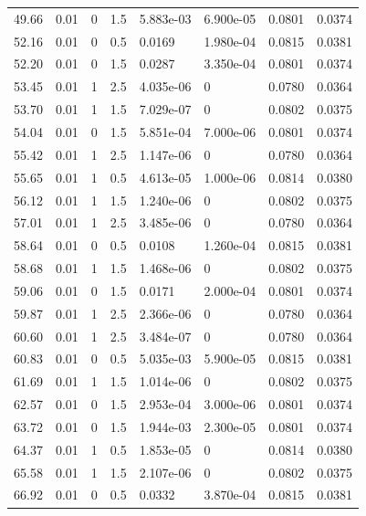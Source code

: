 \documentclass[preview]{standalone}
\begin{document}
{{{\begin{tabular}{L{1.2cm}C{1.2cm} C{0.3cm}C{0.5cm} C{1.4cm}C{1.4cm} C{1.4cm}C{1.4cm}}
  49.66  &  0.01  & 0     & 1.5 &  5.883e-03  & 6.900e-05  & 0.0801 &  0.0374   \\ 
  52.16  &  0.01  & 0     & 0.5 &  0.0169  & 1.980e-04  & 0.0815 &  0.0381   \\ 
  52.20  &  0.01  & 0     & 1.5 &  0.0287  & 3.350e-04  & 0.0801 &  0.0374   \\ 
  53.45  &  0.01  & 1     & 2.5 &  4.035e-06  & 0  & 0.0780 &  0.0364   \\ 
  53.70  &  0.01  & 1     & 1.5 &  7.029e-07  & 0  & 0.0802 &  0.0375   \\ 
  54.04  &  0.01  & 0     & 1.5 &  5.851e-04  & 7.000e-06  & 0.0801 &  0.0374   \\ 
  55.42  &  0.01  & 1     & 2.5 &  1.147e-06  & 0  & 0.0780 &  0.0364   \\ 
  55.65  &  0.01  & 1     & 0.5 &  4.613e-05  & 1.000e-06  & 0.0814 &  0.0380   \\ 
  56.12  &  0.01  & 1     & 1.5 &  1.240e-06  & 0  & 0.0802 &  0.0375   \\ 
  57.01  &  0.01  & 1     & 2.5 &  3.485e-06  & 0  & 0.0780 &  0.0364   \\ 
  58.64  &  0.01  & 0     & 0.5 &  0.0108  & 1.260e-04  & 0.0815 &  0.0381   \\ 
  58.68  &  0.01  & 1     & 1.5 &  1.468e-06  & 0  & 0.0802 &  0.0375   \\ 
  59.06  &  0.01  & 0     & 1.5 &  0.0171  & 2.000e-04  & 0.0801 &  0.0374   \\ 
  59.87  &  0.01  & 1     & 2.5 &  2.366e-06  & 0  & 0.0780 &  0.0364   \\ 
  60.60  &  0.01  & 1     & 2.5 &  3.484e-07  & 0  & 0.0780 &  0.0364   \\ 
  60.83  &  0.01  & 0     & 0.5 &  5.035e-03  & 5.900e-05  & 0.0815 &  0.0381   \\ 
  61.69  &  0.01  & 1     & 1.5 &  1.014e-06  & 0  & 0.0802 &  0.0375   \\ 
  62.57  &  0.01  & 0     & 1.5 &  2.953e-04  & 3.000e-06  & 0.0801 &  0.0374   \\ 
  63.72  &  0.01  & 0     & 1.5 &  1.944e-03  & 2.300e-05  & 0.0801 &  0.0374   \\ 
  64.37  &  0.01  & 1     & 0.5 &  1.853e-05  & 0  & 0.0814 &  0.0380   \\ 
  65.58  &  0.01  & 1     & 1.5 &  2.107e-06  & 0  & 0.0802 &  0.0375   \\ 
  66.92  &  0.01  & 0     & 0.5 &  0.0332  & 3.870e-04  & 0.0815 &  0.0381   \\ 

\end{tabular}}}}
\end{document}
